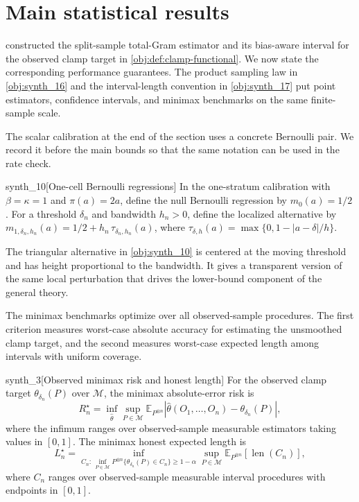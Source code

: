 \section{Main statistical results}
\label{sec:main-statistical-results}

 constructed the split-sample total-Gram estimator and its bias-aware interval for the observed clamp target in \cref{obj:def:clamp-functional}. We now state the corresponding performance guarantees. The product sampling law in \cref{obj:synth_16} and the interval-length convention in \cref{obj:synth_17} put point estimators, confidence intervals, and minimax benchmarks on the same finite-sample scale.

The scalar calibration at the end of the section uses a concrete Bernoulli pair. We record it before the main bounds so that the same notation can be used in the rate check.

\begin{definitionv}{synth_10}[One-cell Bernoulli regressions]
In the one-stratum calibration with \(\beta=\kappa=1\) and \(\pi(a)=2a\), define the null Bernoulli regression by \(m_0(a)=1/2\). For a threshold \(\delta_n\) and bandwidth \(h_n>0\), define the localized alternative by \(m_{1,\delta_n,h_n}(a)=1/2+h_n\,\tau_{\delta_n,h_n}(a)\), where \(\tau_{\delta,h}(a)=\max\{0,1-|a-\delta|/h\}\).
\end{definitionv}

The triangular alternative in \cref{obj:synth_10} is centered at the moving threshold and has height proportional to the bandwidth. It gives a transparent version of the same local perturbation that drives the lower-bound component of the general theory.

The minimax benchmarks optimize over all observed-sample procedures. The first criterion measures worst-case absolute accuracy for estimating the unsmoothed clamp target, and the second measures worst-case expected length among intervals with uniform coverage.

\begin{definitionv}{synth_3}[Observed minimax risk and honest length]
For the observed clamp target \(\theta_{\delta_n}(P)\) over \(\mathcal M\), the minimax absolute-error risk is
\[
  R_n^\star=\inf_{\widehat\theta}\sup_{P\in\mathcal M}
  \mathbb E_{P^{\otimes n}}\!\left|\widehat\theta(O_1,\ldots,O_n)-\theta_{\delta_n}(P)\right|,
\]
where the infimum ranges over observed-sample measurable estimators taking values in \([0,1]\). The minimax honest expected length is
\[
  L_n^\star=\inf_{C_n:\,\inf_{P\in\mathcal M}P^{\otimes n}\{\theta_{\delta_n}(P)\in C_n\}\ge 1-\alpha}
  \sup_{P\in\mathcal M}\mathbb E_{P^{\otimes n}}[\operatorname{len}(C_n)],
\]
where \(C_n\) ranges over observed-sample measurable interval procedures with endpoints in \([0,1]\).
\end{definitionv}

